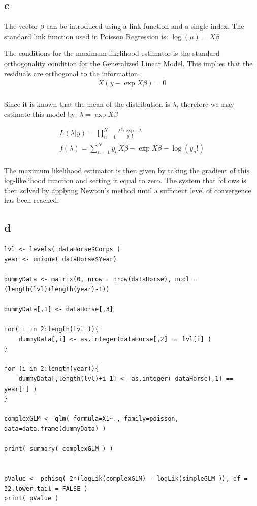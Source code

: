 \documentclass[11pt]{article}
\begin{document}
\subsection{c}
\label{sec-1-3}
The vector \textbf{$\beta$} can be introduced using a link function and a single
index. The standard link function used in Poisson Regression is: $\log(\mu) =
X \beta$

The conditions for the maximum likelihood estimator is the standard
orthogonality condition for the Generalized Linear Model. This implies
that the residuals are orthogonal to the information. 
\begin{align*}
 X(  y - \exp{ X \beta  } ) = 0\\
\end{align*}

Since it is known that the mean of the distribution is $\lambda$, therefore we
may estimate this model by: $\lambda = \exp{ X \beta  }$

\begin{align*}
L( \lambda | y ) = \prod_{n=1}^N \frac{  \lambda^{y_n} \exp{ - \lambda } }{ y_n ! }\\
f( \lambda ) = \sum_{n=1}^N y_n X \beta   - \exp{ X \beta  } - \log( y_n ! )\\
\end{align*}

The maximum likelihood estimator is then given by taking the gradient
of this log-likelihood function and setting it equal to zero. The
system that follows is then solved by applying Newton's method until a
sufficient level of convergence has been reached.

\subsection{d}
\label{sec-1-4}
\begin{verbatim}
lvl <- levels( dataHorse$Corps )
year <- unique( dataHorse$Year)

dummyData <- matrix(0, nrow = nrow(dataHorse), ncol = (length(lvl)+length(year)-1))

dummyData[,1] <- dataHorse[,3]

for( i in 2:length(lvl )){
    dummyData[,i] <- as.integer(dataHorse[,2] == lvl[i] )
}

for (i in 2:length(year)){
    dummyData[,length(lvl)+i-1] <- as.integer( dataHorse[,1] == year[i] )
}

complexGLM <- glm( formula=X1~., family=poisson, data=data.frame(dummyData) )

print( summary( complexGLM ) )


pValue <- pchisq( 2*(logLik(complexGLM) - logLik(simpleGLM )), df = 32,lower.tail = FALSE )
print( pValue )
\end{verbatim}
\end{document}
